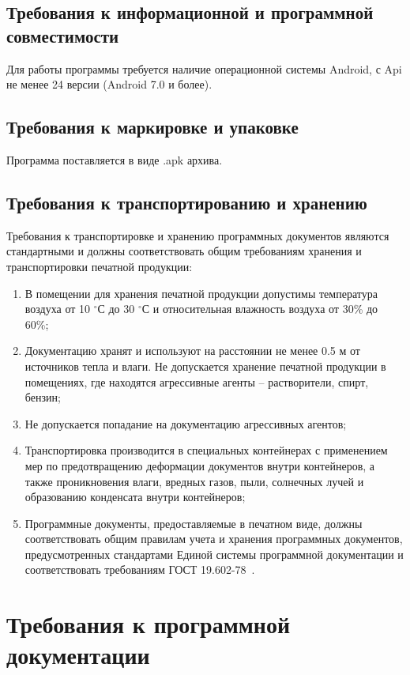 \documentclass[testmethods]{espd}
\begin{document}
\subsection{Требования к информационной и программной совместимости}
Для работы программы требуется наличие операционной системы Android, с Api не менее 24 версии (Android 7.0 и более).

\subsection{Требования к маркировке и упаковке}
Программа поставляется в виде .apk архива.

\subsection{Требования к транспортированию и хранению}
Требования к транспортировке и хранению программных документов являются стандартными и должны соответствовать общим требованиям хранения и транспортировки печатной продукции:

\begin{enumerate}
\item В помещении для хранения печатной продукции допустимы температура воздуха от 10 $^\circ$С до 30 $^\circ$С и относительная влажность воздуха от 30\% до 60\%;
\item Документацию хранят и используют на расстоянии не менее 0.5 м от источников тепла и влаги. Не допускается хранение печатной продукции в помещениях, где находятся агрессивные агенты – растворители, спирт, бензин;
\item Не допускается попадание на документацию агрессивных агентов;
\item Транспортировка производится в специальных контейнерах с применением мер по предотвращению деформации документов внутри контейнеров, а также проникновения влаги, вредных газов, пыли, солнечных лучей и образованию конденсата внутри контейнеров;
\item Программные документы, предоставляемые в печатном виде, должны соответствовать общим правилам учета и хранения программных документов, предусмотренных стандартами Единой системы программной документации и соответствовать требованиям ГОСТ 19.602-78~\cite{espd602}.
\end{enumerate}

\section{Требования к программной документации}
\end{document}
